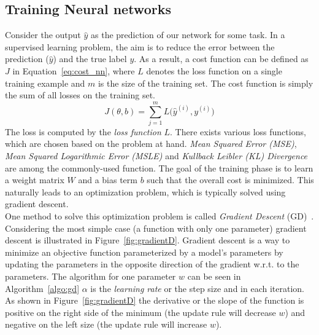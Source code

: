 \subsection{Training  Neural networks}
Consider the output $\hat { y } $ as the prediction of our network for some task. In a supervised learning problem, the aim is to reduce the error between the prediction ($\hat { y } $) and the true label $y$. As a result, a cost function can be defined as $J$ in Equation~\ref{eq:cost_nn}, where $L$ denotes the loss function on a single training example and $m$ is the size of the training set. The cost function is simply the sum of all losses on the training set. 
\begin{equation}
J(\theta,b)=\sum _{ j=1 }^{ m }{ L( } \hat { y }^{ (i) } ,y^{ (i) })
\label{eq:cost_nn}
\end{equation}
The loss is computed by the \emph{loss function} $L$. There exists various loss functions, which are chosen based on the problem at hand. \emph{Mean Squared Error (MSE)}, \emph{Mean Squared Logarithmic Error (MSLE)} and \emph{Kullback Leibler (KL) Divergence} are among the commonly-used function. 
The goal of the training phase is to learn a weight matrix $W$ and a bias term $b$ such that the overall cost is minimized. This naturally leads to an optimization problem, which is  typically solved using gradient descent.\\
\noindent 
One method to solve this optimization problem is called \emph{Gradient Descent} (GD)~. Considering the most simple case (a function with only one parameter) gradient descent is illustrated in Figure~\ref{fig:gradientD}. Gradient descent is a way to minimize an objective function parameterized by a model’s parameters by updating the parameters in the opposite direction of the gradient w.r.t. to the parameters.
The algorithm for one parameter $w$ can be
seen in Algorithm~\ref{algo:gd}  $\alpha$ is the \emph{learning rate} or the step size and  in each iteration.
As shown in Figure~\ref{fig:gradientD} the derivative or the slope of the function is positive on the right side of the minimum (the update rule will decrease $w$) and negative on the left size (the update rule will increase $w$). \\

